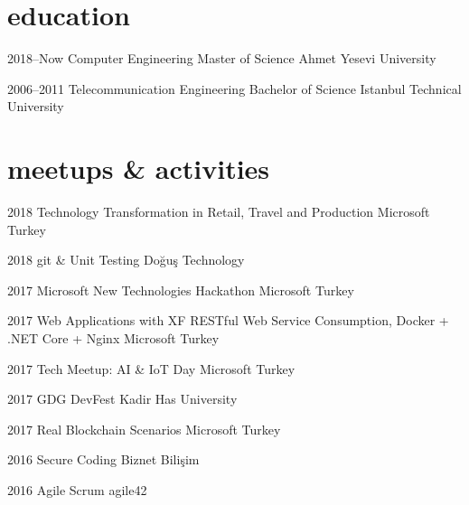 \documentclass[]{../friggeri-cv} %
\begin{document}
\section{education}

\begin{entrylist}

\entry
{2018--Now}
{Computer Engineering}
{Master of Science}
{Ahmet Yesevi University}
	
\entry
{2006--2011}
{Telecommunication Engineering}
{Bachelor of Science}
{Istanbul Technical University}
	
\end{entrylist}

\section{meetups \& activities}

\begin{entrylist}

\entry
{2018}
{Technology Transformation in Retail, Travel and Production}
{}
{Microsoft Turkey}

\entry
{2018}
{git \& Unit Testing}
{}
{Doğuş Technology}

\entry
{2017}
{Microsoft New Technologies Hackathon}
{}
{Microsoft Turkey}

\entry
{2017}
{Web Applications with XF RESTful Web Service Consumption, Docker + .NET Core + Nginx}
{}
{Microsoft Turkey}

\entry
{2017}
{Tech Meetup: AI \& IoT Day}
{}
{Microsoft Turkey}

\entry
{2017}
{GDG DevFest}
{}
{Kadir Has University}

\entry
{2017}
{Real Blockchain Scenarios}
{}
{Microsoft Turkey}

\entry
{2016}
{Secure Coding}
{}
{Biznet Bilişim}

\entry
{2016}
{Agile Scrum}
{}
{agile42}

\end{entrylist}
\end{document}
